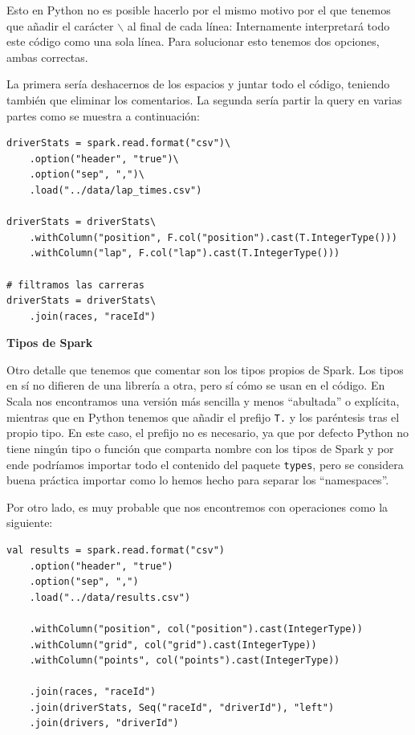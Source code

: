 \documentclass[12pt,twoside,titlepage]{report}
\newcommand{\quotes}[1]{``#1''}
\begin{document}
Esto en Python no es posible hacerlo por el mismo motivo por el que tenemos que añadir el carácter \texttt{$\backslash$} al final de cada línea: Internamente interpretará todo este código como una sola línea. Para solucionar esto tenemos dos opciones, ambas correctas.

La primera sería deshacernos de los espacios y juntar todo el código, teniendo también que eliminar los comentarios. La segunda sería partir la query en varias partes como se muestra a continuación:

\begin{lstlisting}
driverStats = spark.read.format("csv")\
	.option("header", "true")\
	.option("sep", ",")\
	.load("../data/lap_times.csv")
	
driverStats = driverStats\
	.withColumn("position", F.col("position").cast(T.IntegerType())) 
	.withColumn("lap", F.col("lap").cast(T.IntegerType())) 
	
# filtramos las carreras
driverStats = driverStats\
	.join(races, "raceId")
\end{lstlisting}


\textbf{Tipos de Spark}

Otro detalle que tenemos que comentar son los tipos propios de Spark. Los tipos en sí no difieren de una librería a otra, pero sí cómo se usan en el código. En Scala nos encontramos una versión más sencilla y menos \quotes{abultada} o explícita, mientras que en Python tenemos que añadir el prefijo \texttt{T.} y los paréntesis tras el propio tipo. En este caso, el prefijo no es necesario, ya que por defecto Python no tiene ningún tipo o función que comparta nombre con los tipos de Spark y por ende podríamos importar todo el contenido del paquete \texttt{types}, pero se considera buena práctica importar como lo hemos hecho para separar los \quotes{namespaces}. 

Por otro lado, es muy probable que nos encontremos con operaciones como la siguiente:

\begin{lstlisting}
val results = spark.read.format("csv")
	.option("header", "true")
	.option("sep", ",")
	.load("../data/results.csv")

	.withColumn("position", col("position").cast(IntegerType))    
	.withColumn("grid", col("grid").cast(IntegerType))    
	.withColumn("points", col("points").cast(IntegerType))

	.join(races, "raceId")
	.join(driverStats, Seq("raceId", "driverId"), "left")
	.join(drivers, "driverId")
\end{lstlisting}
\end{document}
